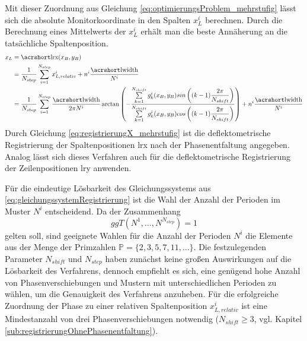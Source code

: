 \p
Mit dieser Zuordnung aus Gleichung \ref{eq:optimierungsProblem_mehrstufig} lässt sich die absolute Monitorkoordinate in den Spalten $x_L^i$ berechnen. 
Durch die Berechnung eines Mittelwerts der $x_L^i$ erhält man die beste Annäherung an die tatsächliche Spaltenposition.
%
\begin{equation}\label{eq:registrierungX_mehrstufig}
	\begin{split}
		x_L
		& =
			\acrshortmath{lrx}(x_B, y_B)\\
		& =
			\dfrac{1}{N_{step}}
			\sum\limits_{i = 1}^{N_{step}}
			x_{L,relativ}^i + n^i \dfrac{\acrshortmath{lwidth}}{N^i}\\
		& =
			\dfrac{1}{N_{step}}
			\sum\limits_{i = 1}^{N_{step}}
			\dfrac{\acrshortmath{lwidth}}{2\pi N^i}
			\arctan
			\left(
				-\dfrac
				{\sum\limits_{k=1}^{N_{shift}} g_k^i(x_B, y_B) sin\left((k - 1)\dfrac{2\pi}{N_{shift}}\right)}
				{\sum\limits_{k=1}^{N_{shift}} g_k^i(x_B, y_B) cos\left((k - 1)\dfrac{2\pi}{N_{shift}}\right)}
			\right)
			+ n^i \dfrac{\acrshortmath{lwidth}}{N^i}
	\end{split}
\end{equation}
%
Durch Gleichung \ref{eq:registrierungX_mehrstufig} ist die deflektometrische Registrierung der Spaltenpositionen \acrshort{lrx} nach der Phasenentfaltung angegeben.
Analog lässt sich dieses Verfahren auch für die deflektometrische Registrierung der Zeilenpositionen \acrshort{lry} anwenden.

\p
Für die eindeutige Lösbarkeit des Gleichungssystems aus \ref{eq:gleichungssystemRegistrierung} ist die Wahl der Anzahl der Perioden im Muster $N^i$ entscheidend.
Da der Zusammenhang
%
\begin{equation*}
	ggT(N^1, \ldots, N^{N_{step}}) = 1
\end{equation*}
%
gelten soll, sind geeignete Wahlen für die Anzahl der Perioden $N^i$ die Elemente aus der Menge der Primzahlen $\mathbb{P} = \lbrace 2, 3, 5, 7, 11,\ldots\rbrace$.
Die festzulegenden Parameter $N_{shift}$ und $N_{step}$ haben zunächst keine großen Auswirkungen auf die Lösbarkeit des Verfahrens, dennoch empfiehlt es sich, eine genügend hohe Anzahl von Phasenverschiebungen und Mustern mit unterschiedlichen Perioden zu wählen, um die Genauigkeit des Verfahrens anzuheben.
Für die erfolgreiche Zuordnung der Phase zu einer relativen Spaltenposition $x_{L,relativ}^i$ ist eine Mindestanzahl von drei Phasenverschiebungen notwendig ($N_{shift} \geq 3$, vgl. Kapitel \ref{sub:registrierungOhnePhasenentfaltung}). 

